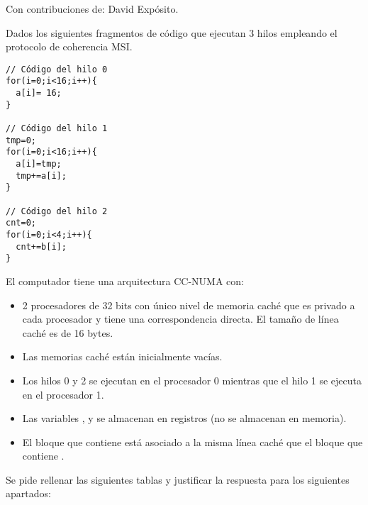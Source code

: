 \begin{acexercise}
Con contribuciones de: David Expósito.
\end{acexercise}
\label{ex:m5-02:dir-01}

Dados los siguientes fragmentos de código que ejecutan 3 hilos empleando el
protocolo de coherencia MSI.

\begin{lstlisting}
// Código del hilo 0
for(i=0;i<16;i++){
  a[i]= 16;
}
 
// Código del hilo 1
tmp=0;
for(i=0;i<16;i++){
  a[i]=tmp;
  tmp+=a[i];
}
 
// Código del hilo 2
cnt=0;
for(i=0;i<4;i++){
  cnt+=b[i];
}
\end{lstlisting}

El computador tiene una arquitectura CC-NUMA con:

\begin{itemize}
  \item 2 procesadores de 32 bits con único nivel de memoria caché que 
        es privado a cada procesador y tiene una correspondencia directa. 
        El tamaño de línea caché es de 16 bytes. 
  \item Las memorias caché están inicialmente vacías.
  \item Los hilos 0 y 2 se ejecutan en el procesador 0 mientras que el hilo 1 
        se ejecuta en el procesador  1.
  \item Las variables ,  y  se almacenan en 
        registros (no se almacenan en memoria). 
  \item El bloque que contiene  está asociado a la misma línea 
        caché que el bloque que contiene .
\end{itemize}

Se pide rellenar las siguientes tablas y justificar la respuesta para los siguientes apartados:

